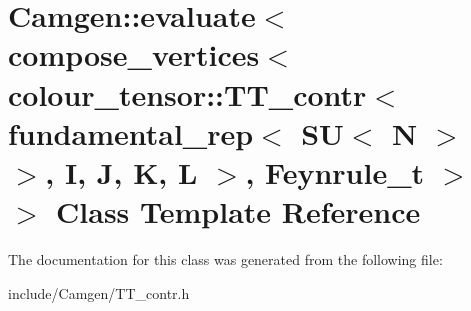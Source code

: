 \hypertarget{a00174}{\section{Camgen\-:\-:evaluate$<$ compose\-\_\-vertices$<$ colour\-\_\-tensor\-:\-:T\-T\-\_\-contr$<$ fundamental\-\_\-rep$<$ S\-U$<$ N $>$ $>$, I, J, K, L $>$, Feynrule\-\_\-t $>$ $>$ Class Template Reference}
\label{a00174}
}


The documentation for this class was generated from the following file\-:\begin{DoxyCompactItemize}
\item 
include/\-Camgen/T\-T\-\_\-contr.\-h\end{DoxyCompactItemize}
